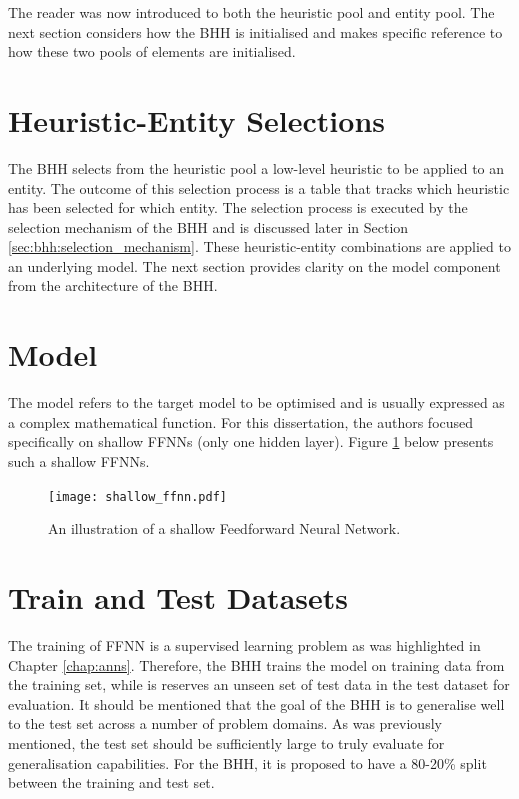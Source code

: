 The reader was now introduced to both the heuristic pool and entity pool. The next section considers how the \ac{BHH} is initialised and makes specific reference to how these two pools of elements are initialised.

\section{Heuristic-Entity Selections}
\label{sec:bhh:heuristic_entity_selections}

The \ac{BHH} selects from the heuristic pool a low-level heuristic to be applied to an entity. The outcome of this selection process is a table that tracks which heuristic has been selected for which entity. The selection process is executed by the selection mechanism of the \ac{BHH} and is discussed later in Section \ref{sec:bhh:selection_mechanism}. These heuristic-entity combinations are applied to an underlying model. The next section provides clarity on the model component from the architecture of the \ac{BHH}.

\section{Model}
\label{sec:bhh:model}

The model refers to the target model to be optimised and is usually expressed as a complex mathematical function. For this dissertation, the authors focused specifically on shallow \acp{FFNN} (only one hidden layer). Figure \ref{fig:shallow_ffnn} below presents such a shallow \acp{FFNN}.

\begin{figure}[H]
      \centering
      \texttt{[image: shallow\_ffnn.pdf]}
      \caption[Shallow Feedforward Neural Network]{An illustration of
            a shallow Feedforward Neural Network.}
      \label{fig:shallow_ffnn}
\end{figure}

\section{Train and Test Datasets}
\label{sec:bhh:train_test_datasets}

The training of \ac{FFNN} is a supervised learning problem as was highlighted in Chapter \ref{chap:anns}. Therefore, the \ac{BHH} trains the model on training data from the training set, while is reserves an unseen set of test data in the test dataset for evaluation. It should be mentioned that the goal of the \ac{BHH} is to generalise well to the test set across a number of problem domains. As was previously mentioned, the test set should be sufficiently large to truly evaluate for generalisation capabilities. For the \ac{BHH}, it is proposed to have a 80-20\% split between the training and test set.

